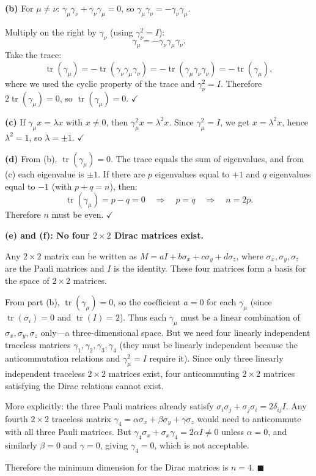 \documentclass[12pt]{article}
\begin{document}
\medskip
\textbf{(b)} For $\mu \neq \nu$: $\gamma_\mu \gamma_\nu + \gamma_\nu \gamma_\mu = 0$, so $\gamma_\mu \gamma_\nu = -\gamma_\nu \gamma_\mu$.

Multiply on the right by $\gamma_\nu$ (using $\gamma_\nu^2 = I$):
\[
\gamma_\mu = -\gamma_\nu \gamma_\mu \gamma_\nu.
\]
Take the trace:
\[
\operatorname{tr}(\gamma_\mu) = -\operatorname{tr}(\gamma_\nu \gamma_\mu \gamma_\nu) = -\operatorname{tr}(\gamma_\mu \gamma_\nu \gamma_\nu) = -\operatorname{tr}(\gamma_\mu),
\]
where we used the cyclic property of the trace and $\gamma_\nu^2 = I$. Therefore $2\operatorname{tr}(\gamma_\mu) = 0$, so $\operatorname{tr}(\gamma_\mu) = 0$. $\checkmark$

\medskip
\textbf{(c)} If $\gamma_\mu x = \lambda x$ with $x \neq 0$, then $\gamma_\mu^2 x = \lambda^2 x$. Since $\gamma_\mu^2 = I$, we get $x = \lambda^2 x$, hence $\lambda^2 = 1$, so $\lambda = \pm 1$. $\checkmark$

\medskip
\textbf{(d)} From (b), $\operatorname{tr}(\gamma_\mu) = 0$. The trace equals the sum of eigenvalues, and from (c) each eigenvalue is $\pm 1$. If there are $p$ eigenvalues equal to $+1$ and $q$ eigenvalues equal to $-1$ (with $p + q = n$), then:
\[
\operatorname{tr}(\gamma_\mu) = p - q = 0 \quad \Rightarrow \quad p = q \quad \Rightarrow \quad n = 2p.
\]
Therefore $n$ must be even. $\checkmark$

\medskip
\textbf{(e) and (f): No four $2 \times 2$ Dirac matrices exist.}

Any $2 \times 2$ matrix can be written as $M = aI + b\sigma_x + c\sigma_y + d\sigma_z$, where $\sigma_x, \sigma_y, \sigma_z$ are the Pauli matrices and $I$ is the identity. These four matrices form a basis for the space of $2 \times 2$ matrices.

From part (b), $\operatorname{tr}(\gamma_\mu) = 0$, so the coefficient $a = 0$ for each $\gamma_\mu$ (since $\operatorname{tr}(\sigma_i) = 0$ and $\operatorname{tr}(I) = 2$). Thus each $\gamma_\mu$ must be a linear combination of $\sigma_x, \sigma_y, \sigma_z$ only---a three-dimensional space. But we need four linearly independent traceless matrices $\gamma_1, \gamma_2, \gamma_3, \gamma_4$ (they must be linearly independent because the anticommutation relations and $\gamma_\mu^2 = I$ require it). Since only three linearly independent traceless $2 \times 2$ matrices exist, four anticommuting $2 \times 2$ matrices satisfying the Dirac relations cannot exist.

More explicitly: the three Pauli matrices already satisfy $\sigma_i \sigma_j + \sigma_j \sigma_i = 2\delta_{ij}I$. Any fourth $2\times 2$ traceless matrix $\gamma_4 = \alpha\sigma_x + \beta\sigma_y + \gamma\sigma_z$ would need to anticommute with all three Pauli matrices. But $\gamma_4 \sigma_x + \sigma_x \gamma_4 = 2\alpha I \neq 0$ unless $\alpha = 0$, and similarly $\beta = 0$ and $\gamma = 0$, giving $\gamma_4 = 0$, which is not acceptable.

Therefore the minimum dimension for the Dirac matrices is $n = 4$. \hfill $\blacksquare$
\end{document}
